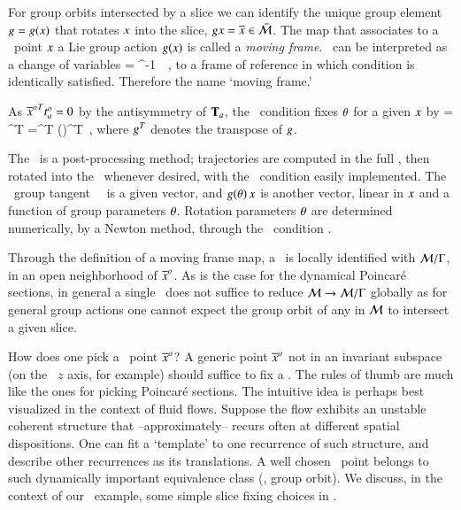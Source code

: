 
For group orbits intersected by a slice we can identify the unique group element
$g=g(x)$ that rotates $x$ into the slice,
$gx = \overline{x} \in \bar{\cal M}$. The map that
associates to a \statesp\ point $x$ a Lie group action
$g(x)$ is called a \emph{moving frame}. \Mframes\
can be interpreted as a change of variables
\beq
\sspRed = \LieEl^{-1} \, \ssp
\,,
to a frame of reference in which condition
 is identically satisfied. Therefore the name
`moving frame.'



As ${\overline{x}^o}^T t^o_{a} =0$ by the antisymmetry of
$\mathbf{T}_a$, the \slice\ condition  fixes
${\bf \theta}$ for a given $x$ by
    \index{post-processing}
 = \sspRed^T  
	=\ssp^T  \LieEl(\gSpace)^T 
\,,
where $g^T$ denotes the transpose of $g$.



The \mframes\ is a post-processing method; trajectories are
computed in the full \statesp, then rotated into the \slice\
whenever desired, with the \slice\ condition easily
implemented. The \slice\ group tangent \sliceTan\ \, is a given
vector, and $g({\bf \theta})\,x$ is
another vector, linear in $x$ and a function of group
parameters ${\bf \theta}$. Rotation parameters ${\bf \theta}$ are
determined numerically, by a Newton method, through the \slice\
condition .


Through the definition of a moving frame map, a \slice\ is
locally identified with ${\cal M}/\Gamma$, in an open
neighborhood of ${\overline{x}^o}$. As is the case for the dynamical
Poincar\'e sections, in general a single \slice\ does not
suffice to reduce ${\cal M} \to {\cal M}/\Gamma$ globally as
for general group actions one cannot expect the group orbit
of any in ${\cal M}$ to intersect a given slice.

How does one pick a \slice\ point ${\overline{x}^o}$? A generic point
${\overline{x}^o} $ not in an invariant subspace (on the \cLe\ $z$
axis, for example) should suffice to fix a \slice.
The rules of thumb are much like the ones for picking
Poincar\'e sections. The intuitive
idea is perhaps best visualized in the context of fluid
flows. Suppose the flow exhibits an unstable coherent
structure that --approximately-- recurs often at different
spatial dispositions. One can fit a `template' to one
recurrence of such structure, and describe other recurrences
as its translations. A well chosen \slice\ point belongs to
such dynamically important equivalence class (\ie, group
orbit).
We discuss, in the context of our \cLe\ example, some simple slice fixing
choices in \refsects{s:cleCoordSlice}{s:mfReqb}.


